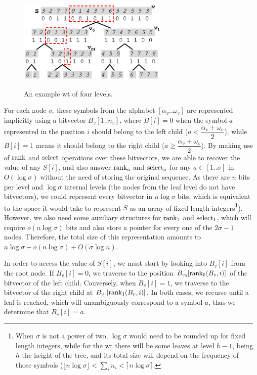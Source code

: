\documentclass[a4paper,10pt,twoside]{book}
\begin{document}
    \begin{figure}[ht]
		\begin{center}
			{\includegraphics[width=0.65\textwidth]{figures/wt1.eps}}
		\end{center}
		\caption{An example \acrlong{wt} of four levels.}
		\label{fig:wt}
	\end{figure}
    
    For each node $v$, these symbols from the alphabet $[\alpha_v..\omega_v]$ are represented implicitly using a bitvector $B_v[1..n_v]$, where $B[i] = 0$ when the symbol $a$ represented in the position $i$ should belong to the left child ($a < \dfrac{\alpha_v + \omega_v}{2}$), while $B[i] = 1$ means it should belong to the right child ($a \geq \dfrac{\alpha_v + \omega_v}{2}$). By making use of $\operatorname{rank}$ and $\operatorname{select}$ operations over these bitvectors, we are able to recover the value of any $S[i]$, and also answer $\operatorname{rank}_a$ and $\operatorname{select}_a$ for any $a \in [1..\sigma]$ in $O(\log\sigma)$ without the need of storing the original sequence. As there are $n$ bits per level and $\log\sigma$ internal levels (the nodes from the leaf level do not have bitvectors), we could represent every bitvector in $n\log\sigma$ bits, which is equivalent to the space it would take to represent $S$ as an array of fixed length integers\footnote{When $\sigma$ is not a power of two, $\log\sigma$ would need to be rounded up for fixed length integers, while for the \gls{wt} there will be some leaves at level $h-1$, being $h$ the height of the tree, and its total size will depend on the frequency of those symbols ($\lfloor n\log\sigma\rfloor < \sum_i n_i < \rceil n\log\sigma\rceil$.}). However, we also need some auxiliary structures for $\operatorname{rank}_1$ and $\operatorname{select}_1$, which will require $o(n\log\sigma)$ bits and also store a pointer for every one of the $2\sigma-1$ nodes. Therefore, the total size of this representation amounts to $n\log\sigma + o(n\log\sigma) + O(\sigma\log n)$.
    
    In order to access the value of $S[i]$, we must start by looking into $B_v[i]$ from the root node. If $B_v[i]=0$, we traverse to the position $B_{v_0}[\operatorname{rank}_0(B_v,i)]$ of the bitvector of the left child. Conversely, when $B_v[i]=1$, we traverse to the bitvector of the right child at $B_{v_1}[\operatorname{rank}_1(B_v,i)]$. In both cases, we recurse until a leaf is reached, which will unambiguously correspond to a symbol $a$, thus we determine that $B_v[i]=a$.
    
\end{document}

